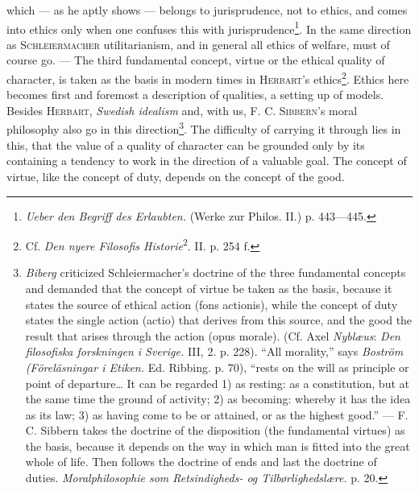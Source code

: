 \documentclass[12pt,a4paper,openany]{book}
\newcommand{\opage}[1]{\marginnote{\footnotesize\textit{[#1]}}}
\begin{document}
which --- as he aptly shows --- belongs to jurisprudence, not to ethics, and comes into ethics only when one
confuses this with jurisprudence\footnote[2]{\textit{Ueber den Begriff des Erlaubten.} (Werke zur Philos.
II.) p. 443---445.}. In the same direction as \textsc{Schleiermacher} utilitarianism, and in general all
ethics of welfare, must of course go. --- The third fundamental concept, virtue or the ethical quality of
character, is taken as the basis in modern times in \textsc{Herbart}'s ethics\footnote[3]{Cf. \textit{Den
nyere Filosofis Historie}\textsuperscript{2}. II. p. 254 f.}. Ethics here becomes first and foremost a
description of qualities, a setting up of models. Besides \textsc{Herbart}, \textit{Swedish idealism} and,
with us, F. C.
\opage{159}\textsc{Sibbern}'s moral philosophy also go in this direction\footnote[1]{\emph{Biberg} criticized
Schleiermacher's doctrine of the three fundamental concepts and demanded that the concept of virtue be taken
as the basis, because it states the source of ethical action (fons actionis), while the concept of duty
states the single action (actio) that derives from this source, and the good the result that arises through
the action (opus morale). (Cf. Axel \emph{Nyblæus}: \textit{Den filosofiska forskningen i Sverige.} III, 2.
p. 228). ``All morality,'' says \emph{Boström} \textit{(Föreläsningar i Etiken.} Ed. Ribbing. p. 70),
``rests on the will as principle or point of departure\dots{} It can be regarded 1) as resting: as a
constitution, but at the same time the ground of activity; 2) as becoming: whereby it has the idea as its
law; 3) as having come to be or attained, or as the highest good.'' --- F. C. Sibbern takes the doctrine of
the disposition (the fundamental virtues) as the basis, because it depends on the way in which man is fitted
into the great whole of life. Then follows the doctrine of ends and last the doctrine of duties.
\textit{Moralphilosophie som Retsindigheds- og Tilbørlighedslære.} p. 20.}. The difficulty of
carrying it through lies in this, that the value of a quality of character can be grounded only by its
containing a tendency to work in the direction of a valuable goal. The concept of virtue, like the concept
of duty, depends on the concept of the good.
\end{document}
